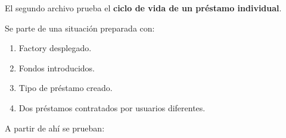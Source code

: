 \begin{enumerate}
\begin{enumerate}
                El segundo archivo prueba el \textbf{ciclo de vida de un préstamo individual}.

                Se parte de una situación preparada con:

                \begin{enumerate}
                    \item Factory desplegado.
                    \item Fondos introducidos.
                    \item Tipo de préstamo creado.
                    \item Dos préstamos contratados por usuarios diferentes.
                \end{enumerate}

                A partir de ahí se prueban:


\end{enumerate}
\end{enumerate}
